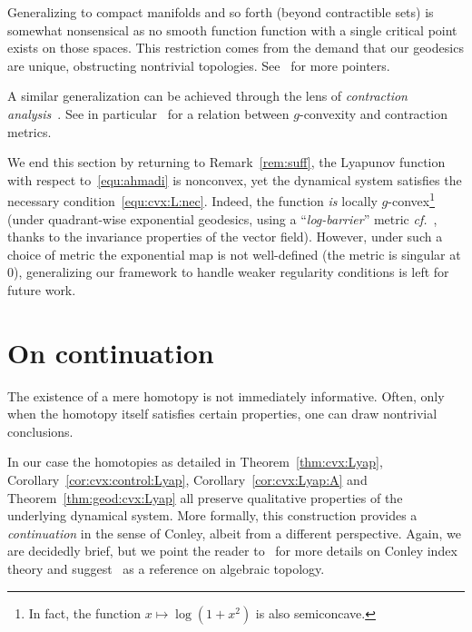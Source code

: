 \documentclass[letterpaper, 10 pt, conference]{ieeeconf}  %
\theoremstyle{mystyle}
\begin{document}
Generalizing to compact manifolds and so forth (beyond contractible sets) is somewhat nonsensical as no smooth function function with a single critical point exists on those spaces. This restriction comes from the demand that our geodesics are unique, obstructing nontrivial topologies. See~\cite[Ch.~4]{ref:udriste2013convex} for more pointers. 

A similar generalization can be achieved through the lens of \textit{contraction analysis}~\cite{ref:lohmiller1998contraction}. See in particular~\cite{ref:wensing2020beyond} for a relation between $g$-convexity and contraction metrics. 

We end this section by returning to Remark~\ref{rem:suff}, the Lyapunov function with respect to~\eqref{equ:ahmadi} is nonconvex, yet the dynamical system satisfies the necessary condition~\eqref{equ:cvx:L:nec}. {Indeed, the function \textit{is} locally $g$-convex\footnote{In fact, the function $x\mapsto \log(1+x^2)$ is also semiconcave.} (under quadrant-wise exponential geodesics, using a ``\textit{log-barrier}'' metric \textit{cf.}~\cite[Ex. 4.8]{ref:vishnoi2018geodesic}, thanks to the invariance properties of the vector field). However, under such a choice of metric the exponential map is not well-defined (the metric is singular at $0$), generalizing our framework to handle weaker regularity conditions is left for future work.} 

\section{On continuation}
\label{sec:continuation}
The existence of a mere homotopy is not immediately informative. Often, only when the homotopy itself satisfies certain properties, one can draw nontrivial conclusions. 

In our case the homotopies as detailed in Theorem~\ref{thm:cvx:Lyap}, Corollary~\ref{cor:cvx:control:Lyap}, Corollary~\ref{cor:cvx:Lyap:A} and Theorem~\ref{thm:geod:cvx:Lyap} all preserve qualitative properties of the underlying dynamical system. More formally, this construction provides a \textit{continuation} in the sense of Conley, albeit from a different perspective. Again, we are decidedly brief, but we point the reader to~\cite{ref:conley1978isolated,ref:mischaikow2002conley} for more details on Conley index theory and suggest~\cite{Hatcher} as a reference on algebraic topology.
\end{document}
